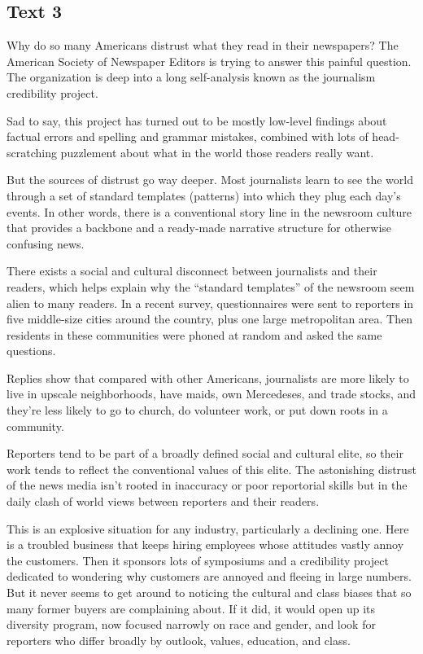 \documentclass[UTF8,11pt]{ctexart}
\begin{document}
\subsection*{\textbf{Text 3}}


Why do so many Americans distrust what they read in their newspapers? The American Society of Newspaper Editors is trying to answer this painful question. The organization is deep into a long self-analysis known as the journalism credibility project.


Sad to say, this project has turned out to be mostly low-level findings about factual errors and spelling and grammar mistakes, combined with lots of head-scratching puzzlement about what in the world those readers really want.


But the sources of distrust go way deeper. Most journalists learn to see the world through a set of standard templates (patterns) into which they plug each day’s events. In other words, there is a conventional story line in the newsroom culture that provides a backbone and a ready-made narrative structure for otherwise confusing news.


There exists a social and cultural disconnect between journalists and their readers, which helps explain why the “standard templates” of the newsroom seem alien to many readers. In a recent survey, questionnaires were sent to reporters in five middle-size cities around the country, plus one large metropolitan area. Then residents in these communities were phoned at random and asked the same questions.


Replies show that compared with other Americans, journalists are more likely to live in upscale neighborhoods, have maids, own Mercedeses, and trade stocks, and they’re less likely to go to church, do volunteer work, or put down roots in a community.


Reporters tend to be part of a broadly defined social and cultural elite, so their work tends to reflect the conventional values of this elite. The astonishing distrust of the news media isn’t rooted in inaccuracy or poor reportorial skills but in the daily clash of world views between reporters and their readers.


This is an explosive situation for any industry, particularly a declining one. Here is a troubled business that keeps hiring employees whose attitudes vastly annoy the customers. Then it sponsors lots of symposiums and a credibility project dedicated to wondering why customers are annoyed and fleeing in large numbers. But it never seems to get around to noticing the cultural and class biases that so many former buyers are complaining about. If it did, it would open up its diversity program, now focused narrowly on race and gender, and look for reporters who differ broadly by outlook, values, education, and class.
\end{document}
